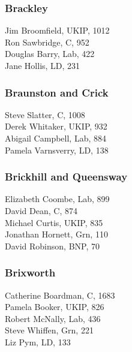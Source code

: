 \documentclass[a4paper,openany,10pt]{book}
\begin{document}
\subsubsection*{Brackley}



Jim Broomfield, UKIP, 1012\\
Ron Sawbridge, C, 952\\
Douglas Barry, Lab, 422\\
Jane Hollis, LD, 231\\


\subsubsection*{Braunston and Crick}



Steve Slatter, C, 1008\\
Derek Whitaker, UKIP, 932\\
Abigail Campbell, Lab, 884\\
Pamela Varnsverry, LD, 138\\


\subsubsection*{Brickhill and Queensway}



Elizabeth Coombe, Lab, 899\\
David Dean, C, 874\\
Michael Curtis, UKIP, 835\\
Jonathan Hornett, Grn, 110\\
David Robinson, BNP, 70\\


\subsubsection*{Brixworth}



Catherine Boardman, C, 1683\\
Pamela Booker, UKIP, 826\\
Robert McNally, Lab, 436\\
Steve Whiffen, Grn, 221\\
Liz Pym, LD, 133\\
\end{document}
